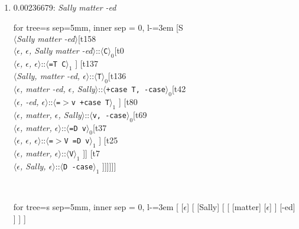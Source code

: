 \documentclass[11pt]{article}
\begin{document}
\begin{enumerate}
	\item  0.00236679: \textit{Sally matter -ed} \\[0.5em]
	\begin{adjustbox}{max width = \textwidth}
	\begin{forest}
	for tree={s sep=5mm, inner sep = 0, l-=3em}
	[S\\$\langle$\textit{Sally matter -ed}$\rangle$[t158\\$\langle$\textit{$\epsilon${,} $\epsilon${,} Sally matter -ed}$\rangle$::$\langle$\texttt{C}$\rangle_0$[t0\\$\langle$\textit{$\epsilon${,} $\epsilon${,} $\epsilon$}$\rangle$::$\langle$\texttt{{=}T C}$\rangle_1$ ] [t137\\$\langle$\textit{Sally{,} matter -ed{,} $\epsilon$}$\rangle$::$\langle$\texttt{T}$\rangle_0$[t136\\$\langle$\textit{$\epsilon${,} matter -ed{,} $\epsilon${,} Sally}$\rangle$::$\langle$\texttt{+case T{,} -case}$\rangle_0$[t42\\$\langle$\textit{$\epsilon${,} -ed{,} $\epsilon$}$\rangle$::$\langle$\texttt{{=}$>$v +case T}$\rangle_1$ ] [t80\\$\langle$\textit{$\epsilon${,} matter{,} $\epsilon${,} Sally}$\rangle$::$\langle$\texttt{v{,} -case}$\rangle_0$[t69\\$\langle$\textit{$\epsilon${,} matter{,} $\epsilon$}$\rangle$::$\langle$\texttt{{=}D v}$\rangle_0$[t37\\$\langle$\textit{$\epsilon${,} $\epsilon${,} $\epsilon$}$\rangle$::$\langle$\texttt{{=}$>$V {=}D v}$\rangle_1$ ] [t25\\$\langle$\textit{$\epsilon${,} matter{,} $\epsilon$}$\rangle$::$\langle$\texttt{V}$\rangle_1$ ]] [t7\\$\langle$\textit{$\epsilon${,} Sally{,} $\epsilon$}$\rangle$::$\langle$\texttt{D -case}$\rangle_1$ ]]]]]]
	\end{forest}
	\end{adjustbox}
	\\
	\begin{adjustbox}{max width = \textwidth}
	\begin{forest}
	for tree={s sep=5mm, inner sep = 0, l-=3em}
	[ [$\epsilon$] [ [Sally] [ [ [matter] [$\epsilon$] ] [-ed] ] ] ]
	\end{forest}
	\end{adjustbox}
	\newpage


\end{enumerate}
\end{document}
